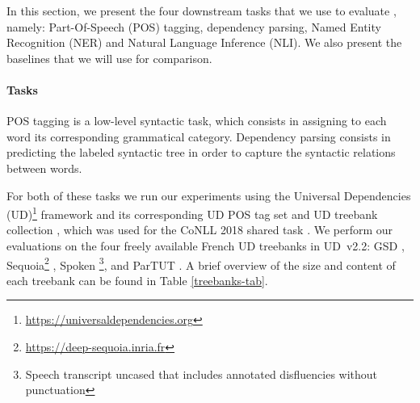 In this section, we present the four downstream tasks that we use to evaluate \camembert, namely: Part-Of-Speech (POS) tagging, dependency parsing, Named Entity Recognition (NER) and Natural Language Inference (NLI). We also present the baselines that we will use for comparison.


\paragraph{Tasks} POS tagging is a low-level syntactic task, which consists in assigning to each word its corresponding grammatical category. Dependency parsing consists in predicting the labeled syntactic tree in order to capture the syntactic relations between words.

For both of these tasks we run our experiments using the Universal Dependencies (UD)\footnote{\url{https://universaldependencies.org}} framework and its corresponding UD POS tag set \citep{petrov-etal-2012-universal} and UD treebank collection \citep{nivre-etal-2018-universal}, which was used for the CoNLL 2018 shared task \citep{seker-etal-2018-universal}. We perform our evaluations on the four freely available French UD treebanks in UD~v2.2: GSD \citep{mcdonald-etal-2013-universal}, Sequoia\footnote{\url{https://deep-sequoia.inria.fr}} \citep{candito-seddah-2012-le,candito-etal-2014-deep}, Spoken \citep{lacheret-etal-2014-rhapsodie,bawden-etal-2014-correcting}\footnote{Speech transcript uncased that includes annotated disfluencies without punctuation}, and ParTUT \cite{sanguinetti-Bosco-2015-parttut}. A brief overview of the size and content of each treebank can be found in Table \ref{treebanks-tab}.


